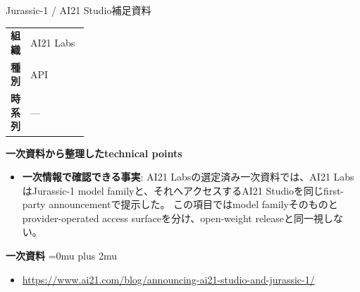 \begin{technicalnote}{Jurassic-1 / AI21 Studio}{補足資料}
\begingroup
\begin{tabularx}{\linewidth}{@{}>{\bfseries}p{0.22\linewidth}X@{}}
組織 & AI21 Labs \\
種別 & API \\
時系列 & — \\
\end{tabularx}
\smallskip
{\bfseries 一次資料から整理したtechnical points}
\begin{itemize}[leftmargin=1.5em,itemsep=0.35em]
\item \textbf{一次情報で確認できる事実}: AI21 Labsの選定済み一次資料では、AI21 LabsはJurassic-1 model familyと、それへアクセスするAI21 Studioを同じfirst-party announcementで提示した。 この項目ではmodel familyそのものとprovider-operated access surfaceを分け、open-weight releaseと同一視しない。
\end{itemize}
\begin{minipage}{\linewidth}
\begin{samepage}
{\bfseries 一次資料}
\begingroup\sloppy
\Urlmuskip=0mu plus 2mu\relax
\begin{itemize}[leftmargin=1.5em,itemsep=0.25em]
\item {\scriptsize\url{https://www.ai21.com/blog/announcing-ai21-studio-and-jurassic-1/}}
\end{itemize}
\endgroup
\end{samepage}
\end{minipage}
\endgroup
\end{technicalnote}
\medskip

